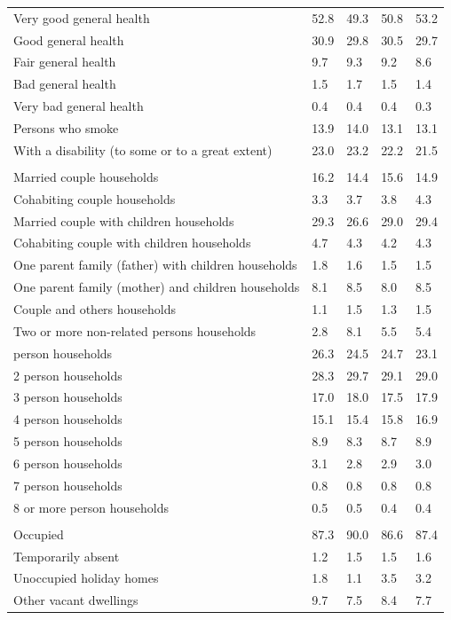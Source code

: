\documentclass{article}
\begin{document}
\begin{table}[h]
\begin{tabular}{KTTTT}
    \hline
Very good general health & 52.8& 49.3&50.8& 53.2\\
Good general health & 30.9& 29.8& 30.5& 29.7\\
Fair general health & 9.7& 9.3&9.2& 8.6\\
Bad general health & 1.5& 1.7&1.5& 1.4\\
Very bad general health & 0.4& 0.4&0.4& 0.3\\
    \hline
Persons who smoke & 13.9& 14.0&13.1& 13.1\\
    \hline
With a disability (to some or to a great extent) & 23.0& 23.2&22.2& 21.5\\
\hline
    \\ 
    \hline
Married couple households & 16.2& 14.4& 15.6& 14.9\\
Cohabiting couple households & 3.3& 3.7& 3.8& 4.3\\
Married couple with children households & 29.3& 26.6& 29.0& 29.4\\
Cohabiting couple with children households & 4.7& 4.3& 4.2& 4.3\\
One parent family (father) with  children households & 1.8& 1.6& 1.5& 1.5\\
One parent family (mother) and children households & 8.1& 8.5& 8.0& 8.5\\
Couple and others households  & 1.1& 1.5& 1.3& 1.5\\
Two or more non-related persons households & 2.8& 8.1& 5.5& 5.4\\
     person households & 26.3& 24.5& 24.7& 23.1\\
2 person households & 28.3& 29.7& 29.1& 29.0\\
3 person households & 17.0& 18.0& 17.5& 17.9\\
4 person households & 15.1& 15.4& 15.8& 16.9\\
5 person households & 8.9& 8.3& 8.7& 8.9\\
6 person households & 3.1& 2.8& 2.9& 3.0\\
7 person households & 0.8& 0.8& 0.8& 0.8\\
8 or more person households & 0.5& 0.5& 0.4& 0.4\\
\hline
    \\ 
    \hline
Occupied & 87.3& 90.0& 86.6& 87.4\\
Temporarily absent & 1.2& 1.5& 1.5& 1.6\\
Unoccupied holiday homes & 1.8& 1.1& 3.5& 3.2\\
Other vacant dwellings & 9.7& 7.5& 8.4& 7.7\\
\hline
\end{tabular}
\end{table}
\end{document}
